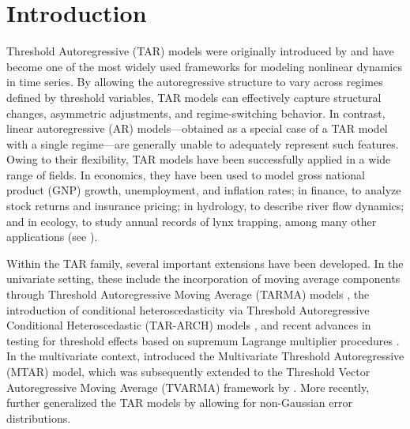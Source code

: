 \section{Introduction}
Threshold Autoregressive (TAR) models were originally introduced by \cite{tong1978threshold,tong1983threshold} and have become one of the most widely used frameworks for modeling nonlinear dynamics in time series. By allowing the autoregressive structure to vary across regimes defined by threshold variables, TAR models can effectively capture structural changes, asymmetric adjustments, and regime-switching behavior. In contrast, linear autoregressive (AR) models—obtained as a special case of a TAR model with a single regime—are generally unable to adequately represent such features. Owing to their flexibility, TAR models have been successfully applied in a wide range of fields. In economics, they have been used to model gross national product (GNP) growth, unemployment, and inflation rates; in finance, to analyze stock returns and insurance pricing; in hydrology, to describe river flow dynamics; and in ecology, to study annual records of lynx trapping, among many other applications (see \cite{T90,hansen2011threshold,Chen2011,TONG2011,TONG2015}).

Within the TAR family, several important extensions have been developed. In the univariate setting, these include the incorporation of moving average components through Threshold Autoregressive Moving Average (TARMA) models \citep{T90}, the introduction of conditional heteroscedasticity via Threshold Autoregressive Conditional Heteroscedastic (TAR-ARCH) models \citep{LIU1997279}, and recent advances in testing for threshold effects based on supremum Lagrange multiplier procedures \citep{Goracci2023,GIANNERINI2024105379}. In the multivariate context, \cite{T98} introduced the Multivariate Threshold Autoregressive (MTAR) model, which was subsequently extended to the Threshold Vector Autoregressive Moving Average (TVARMA) framework by \cite{Niglio2015}. More recently, \cite{VANEGAS2025} further generalized the TAR models by allowing for non-Gaussian error distributions.

